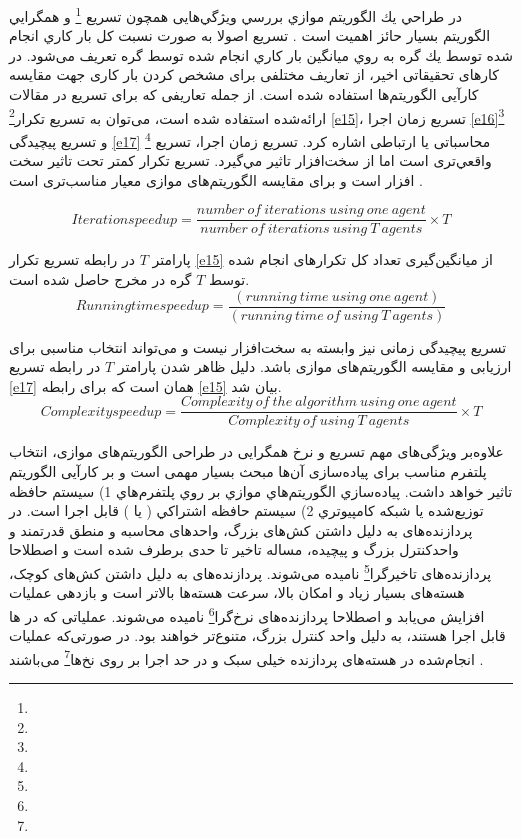 در طراحي يك الگوريتم موازي بررسي ويژگي‌هايی همچون تسريع \footnote{} و همگرايي الگوریتم بسيار حائز اهميت است \cite{nccl}. تسريع اصولا به صورت نسبت كل بار كاري انجام شده توسط يك گره به روي ميانگين بار كاري انجام شده توسط  گره تعریف می‌شود. در کارهای تحقیقاتی اخیر، از تعاریف مختلفی برای مشخص کردن بار کاری جهت مقایسه کارآیی الگوریتم‌ها استفاده شده است. از جمله تعاریفی که برای تسریع در مقالات ارائه‌شده استفاده شده است، می‌توان به تسریع تکرار\footnote{} \ref{e15}، تسریع زمان اجرا \ref{e16}\footnote{} و تسریع پیچیدگی \ref{e17} \footnote{} محاسباتی یا ارتباطی اشاره کرد. تسريع زمان اجرا، تسريع واقعي‌تری است اما از سخت‌افزار تاثير مي‌گيرد. تسريع تكرار كمتر تحت تاثير سخت افزار است و برای مقایسه الگوریتم‌های موازی معیار مناسب‌تری است \cite{lian2019}.

\begin{equation}\label{e15}
	Iteration speedup=\frac{number\ of\ iterations\ using\ one\ agent}{number\ of\ iterations\ using\ T\ agents}\times T
\end{equation}

پارامتر $T$ در رابطه تسریع تکرار  \ref{e15}  از میانگین‌گیری تعداد کل تکرارهای انجام شده توسط $T$ گره در مخرج حاصل شده است.
\begin{equation}\label{e16}
	Running time speedup=\frac{(running\  time\ using\ one\ agent)}{(running\ time\ of\ using\ T\ agents)}
\end{equation}

تسریع پیچیدگی زمانی نیز وابسته به سخت‌افزار نیست و می‌تواند انتخاب مناسبی برای ارزیابی و مقایسه الگوریتم‌های موازی‌ باشد. دلیل ظاهر شدن پارامتر $T$ در رابطه تسریع \ref{e17} همان است که برای رابطه \ref{e15} بیان شد.
\begin{equation}\label{e17}
	Complexity speedup=\frac{Complexity\ of\ the\ algorithm\ using\ one\ agent}{Complexity\  of\ using\ T\ agents}\times T
\end{equation}

علاوه‌بر ویژگی‌های مهم تسریع و نرخ همگرایی در طراحی الگوریتم‌های موازی، انتخاب پلتفرم مناسب برای پیاده‌سازی آن‌ها مبحث بسیار مهمی است و بر کارآیی الگوریتم تاثیر خواهد داشت. پياده‌سازي الگوريتم‌هاي موازي بر روي پلتفرم‌هاي 1) سیستم حافظه توزیع‌شده یا شبكه كامپيوتري 2) سيستم حافظه اشتراكي ( يا ) قابل اجرا است\cite{lian2019}. در پردازنده‌های  به دلیل داشتن کش‌های بزرگ، واحدهای‌ محاسبه و منطق قدرتمند و واحدکنترل بزرگ و پیچیده، مساله تاخیر تا حدی برطرف شده است  و اصطلاحا پردازنده‌های تاخیرگرا\footnote{} نامیده می‌شوند. پردازنده‌های  به دلیل داشتن کش‌های کوچک، هسته‌های بسیار زیاد و امکان  بالا، سرعت هسته‌ها بالاتر است و بازدهی عملیات افزایش می‌یابد و اصطلاحا پردازنده‌های نرخ‌گرا\footnote{} نامیده می‌شوند. عملیاتی که در ها قابل اجرا هستند، به دلیل واحد کنترل بزرگ، متنوع‌تر خواهند بود. در صورتی‌که عملیات انجام‌شده در هسته‌های پردازنده  خیلی سبک و در حد اجرا بر روی نخ‌ها\footnote{}  می‌باشند \cite{Kirk2017, So2015}.

